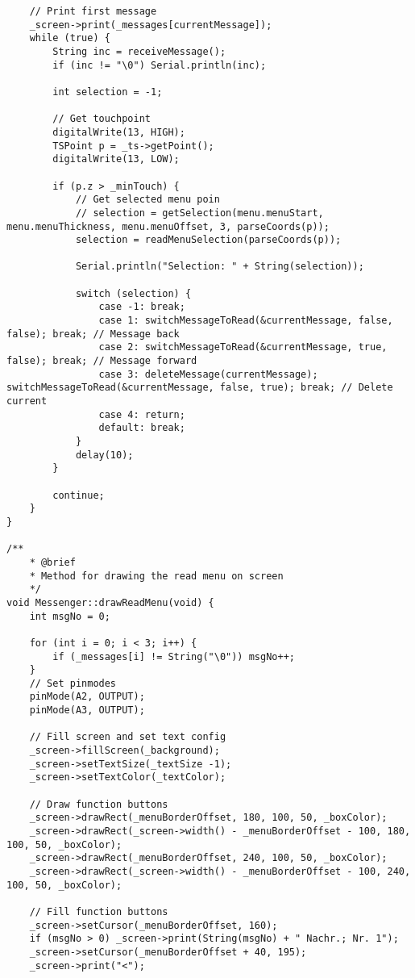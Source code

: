 \documentclass[a4paper, 11pt]{scrartcl}
\begin{document}
\begin{lstlisting}
    // Print first message
    _screen->print(_messages[currentMessage]);
    while (true) {
        String inc = receiveMessage();
        if (inc != "\0") Serial.println(inc);
        
        int selection = -1;
        
        // Get touchpoint
        digitalWrite(13, HIGH);
        TSPoint p = _ts->getPoint();
        digitalWrite(13, LOW);

        if (p.z > _minTouch) {
            // Get selected menu poin
            // selection = getSelection(menu.menuStart, menu.menuThickness, menu.menuOffset, 3, parseCoords(p));
            selection = readMenuSelection(parseCoords(p));

            Serial.println("Selection: " + String(selection));
            
            switch (selection) {
                case -1: break;
                case 1: switchMessageToRead(&currentMessage, false, false); break; // Message back
                case 2: switchMessageToRead(&currentMessage, true, false); break; // Message forward
                case 3: deleteMessage(currentMessage); switchMessageToRead(&currentMessage, false, true); break; // Delete current
                case 4: return;
                default: break;
            }
            delay(10);
        }

        continue;
    }
}

/**
    * @brief 
    * Method for drawing the read menu on screen
    */
void Messenger::drawReadMenu(void) {
    int msgNo = 0;

    for (int i = 0; i < 3; i++) {
        if (_messages[i] != String("\0")) msgNo++;
    }
    // Set pinmodes
    pinMode(A2, OUTPUT);
    pinMode(A3, OUTPUT);

    // Fill screen and set text config
    _screen->fillScreen(_background);
    _screen->setTextSize(_textSize -1);
    _screen->setTextColor(_textColor);

    // Draw function buttons
    _screen->drawRect(_menuBorderOffset, 180, 100, 50, _boxColor);
    _screen->drawRect(_screen->width() - _menuBorderOffset - 100, 180, 100, 50, _boxColor);
    _screen->drawRect(_menuBorderOffset, 240, 100, 50, _boxColor);
    _screen->drawRect(_screen->width() - _menuBorderOffset - 100, 240, 100, 50, _boxColor);

    // Fill function buttons
    _screen->setCursor(_menuBorderOffset, 160);
    if (msgNo > 0) _screen->print(String(msgNo) + " Nachr.; Nr. 1");
    _screen->setCursor(_menuBorderOffset + 40, 195);
    _screen->print("<");


\end{lstlisting}
\end{document}
